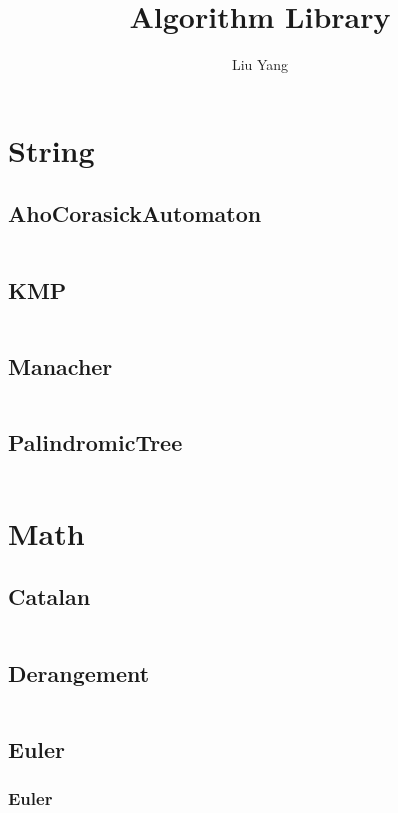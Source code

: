 \documentclass[a4paper,11pt]{article}
\author{Liu Yang}
\title{Algorithm Library}
\begin{document}
 
\maketitle
\newpage
\tableofcontents
\newpage

\section{String}
\subsection{AhoCorasickAutomaton}
\inputminted[breaklines]{c++}{M/我的模板/01++String/+AhoCorasickAutomaton.cpp}
\subsection{KMP}
\inputminted[breaklines]{c++}{M/我的模板/01++String/+KMP.cpp}
\subsection{Manacher}
\inputminted[breaklines]{c++}{M/我的模板/01++String/+Manacher.cpp}
\subsection{PalindromicTree}
\inputminted[breaklines]{c++}{M/我的模板/01++String/+PalindromicTree.cpp}

\newpage
\section{Math}
\subsection{Catalan}
\inputminted[breaklines]{c++}{M/我的模板/02++Math/+Catalan.cpp}
\subsection{Derangement}
\inputminted[breaklines]{c++}{M/我的模板/02++Math/+Derangement.cpp}
\subsection{Euler}
\subsubsection{Euler}
\inputminted[breaklines]{c++}{M/我的模板/02++Math/+Euler/+Euler.cpp}
\end{document}
